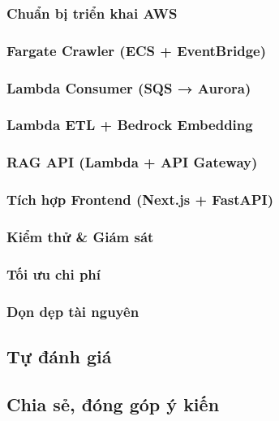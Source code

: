 \subsubsection{Chuẩn bị triển khai AWS}


\subsubsection{Fargate Crawler (ECS + EventBridge)}


\subsubsection{Lambda Consumer (SQS → Aurora)}


\subsubsection{Lambda ETL + Bedrock Embedding}


\subsubsection{RAG API (Lambda + API Gateway)}


\subsubsection{Tích hợp Frontend (Next.js + FastAPI)}


\subsubsection{Kiểm thử \& Giám sát}


\subsubsection{Tối ưu chi phí}


\subsubsection{Dọn dẹp tài nguyên}


\newpage

\subsection{Tự đánh giá}



\newpage

\subsection{Chia sẻ, đóng góp ý kiến}



\newpage

